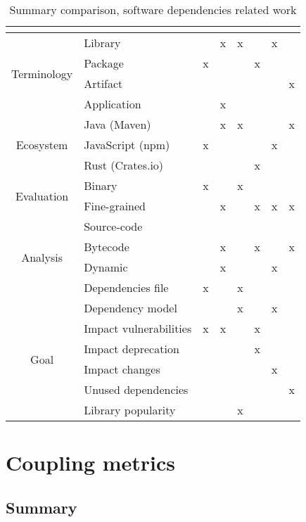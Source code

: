 \begin{table}[ht!]
\begin{center}
  \begin{tabular}{|c|l|c|c|c|c|c|c|}
  \hline
   &  & \cite{hejderup2015dependencies} & \cite{plate2015impact} & \cite{Kula2017} & \cite{hejderup2018prazi} & \cite{hejderup2018software} & \cite{soto2020comprehensive} \\ \hline\hline
  \multirow{4}{*}{Terminology} & Library &  & x & x &  & x &  \\ \cline{2-8}
   & Package & x &  &  & x &  &  \\ \cline{2-8}
   & Artifact &  &  &  &  &  & x \\ \cline{2-8}
   & Application &  & x &  &  &  &  \\ \hline\hline
  \multirow{3}{*}{Ecosystem} & Java (Maven) &  & x & x &  &  & x \\ \cline{2-8}
   & JavaScript (npm) & x &  &  &  & x &  \\ \cline{2-8}
   & Rust (Crates.io) &  &  &  & x &  &  \\ \hline\hline
  \multirow{2}{*}{Evaluation} & Binary & x &  & x &  &  &  \\ \cline{2-8}
   & Fine-grained &  & x &  & x & x & x \\ \hline\hline
  \multirow{4}{*}{Analysis} & Source-code &  &  &  &  &  &  \\ \cline{2-8}
   & Bytecode &  & x &  & x &  & x \\ \cline{2-8}
   & Dynamic &  & x &  &  & x &  \\ \cline{2-8}
   & Dependencies file & x &  & x &  &  &  \\ \hline\hline
  \multirow{6}{*}{Goal} & Dependency model &  &  & x &  & x &  \\ \cline{2-8}
   & Impact vulnerabilities & x & x &  & x &  &  \\ \cline{2-8}
   & Impact deprecation &  &  &  & x &  &  \\ \cline{2-8}
   & Impact changes &  &  &  &  & x &  \\ \cline{2-8}
   & Unused dependencies &  &  &  &  &  & x \\ \cline{2-8}
   & Library popularity &  &  & x &  &  &  \\ \hline
  \end{tabular}
\end{center}
\caption{Summary comparison, software dependencies related work}
\label{table:summary-software-dependencies}
\end{table}


\section{Coupling metrics}

\subsection{Summary}

